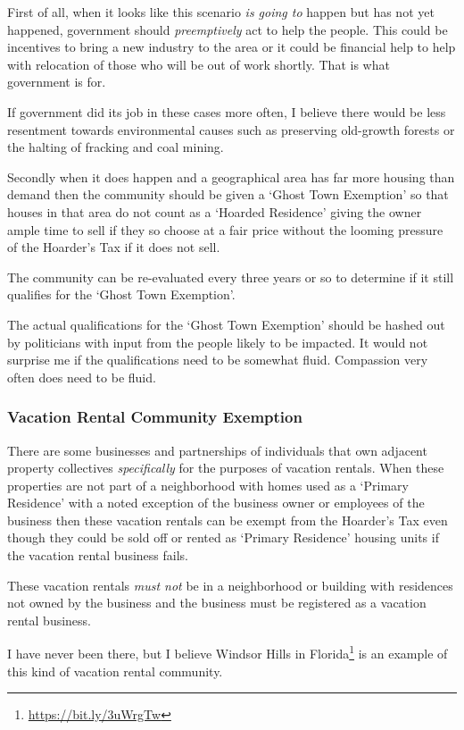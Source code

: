 First of all, when it looks like this scenario \emph{is going to} happen but has not yet happened, government should \emph{preemptively} act to help the people. This could be incentives to bring a new industry to the area or it could be financial help to help with relocation of those who will be out of work shortly. That is what government is for.

If government did its job in these cases more often, I believe there would be less resentment towards environmental causes such as preserving old-growth forests or the halting of fracking and coal mining.

Secondly when it does happen and a geographical area has far more housing than demand then the community should be given a `Ghost Town Exemption' so that houses in that area do not count as a `Hoarded Residence' giving the owner ample time to sell if they so choose at a fair price without the looming pressure of the Hoarder's Tax if it does not sell.

The community can be re-evaluated every three years or so to determine if it still qualifies for the `Ghost Town Exemption'.

The actual qualifications for the `Ghost Town Exemption' should be hashed out by politicians with input from the people likely to be impacted. It would not surprise me if the qualifications need to be somewhat fluid. Compassion very often does need to be fluid.

\subsubsection{Vacation Rental Community Exemption}

There are some businesses and partnerships of individuals that own adjacent property collectives \emph{specifically} for the purposes of vacation rentals. When these properties are not part of a neighborhood with homes used as a `Primary Residence' with a noted exception of the business owner or employees of the business then these vacation rentals can be exempt from the Hoarder's Tax even though they could be sold off or rented as `Primary Residence' housing units if the vacation rental business fails.

These vacation rentals \emph{must not} be in a neighborhood or building with residences not owned by the business and the business must be registered as a vacation rental business.

I have never been there, but I believe Windsor Hills in Florida\footnote{\url{https://bit.ly/3uWrgTw}} is an example of this kind of vacation rental community.

